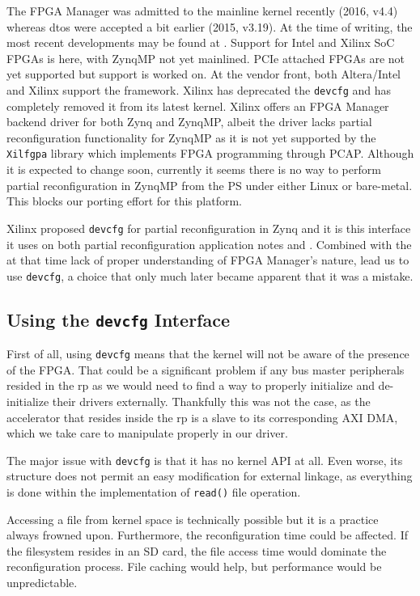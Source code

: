 The FPGA Manager was admitted to the mainline kernel recently (2016, v4.4) whereas \glspl{dto} were accepted a bit earlier (2015, v3.19).
At the time of writing, the most recent developments may be found at \cite{fpgamanagerwhatsnew}. 
Support for Intel and Xilinx SoC FPGAs is here, with ZynqMP not yet mainlined. 
PCIe attached FPGAs are not yet supported but support is worked on.
At the vendor front, both Altera/Intel and Xilinx support the framework. Xilinx has deprecated the \texttt{devcfg} and has
completely removed it from its latest kernel. 
Xilinx offers an FPGA Manager backend driver for both Zynq and ZynqMP, 
albeit the driver lacks partial reconfiguration functionality for ZynqMP as it is not yet supported by the \texttt{Xilfgpa} library
which implements FPGA programming through PCAP.
Although it is expected to change soon, currently it seems there is no way to perform 
partial reconfiguration in ZynqMP from the PS under either Linux or bare-metal. 
This blocks our porting effort for this platform.

Xilinx proposed \texttt{devcfg} for partial reconfiguration in Zynq and it is this interface it uses 
on both partial reconfiguration application notes \cite{xapp1231} and \cite{xapp1159}.
Combined with the at that time lack of proper understanding of FPGA Manager's nature,
lead us to use \texttt{devcfg}, a choice that only much later became apparent that it was a mistake.

\subsection{Using the \texttt{devcfg} Interface}

First of all, using \texttt{devcfg} means that the kernel will not be aware of the presence of the FPGA.
That could be a significant problem if any bus master peripherals resided in the \gls{rp} as we would need to find a way
to properly initialize and de-initialize their drivers externally. Thankfully this was not the case, as the accelerator
that resides inside the \gls{rp} is a slave to its corresponding AXI DMA, which we take care to manipulate properly in our driver.

The major issue with \texttt{devcfg} is that it has no kernel API at all. Even worse, its structure does not permit
an easy modification for external linkage, as everything is done within the implementation of \texttt{read()} file operation.

Accessing a file from kernel space is technically possible but it is a practice always frowned upon. 
Furthermore, the reconfiguration time could be affected. If the filesystem resides in an SD card, the file access time would dominate
the reconfiguration process. File caching would help, but performance would be unpredictable.

